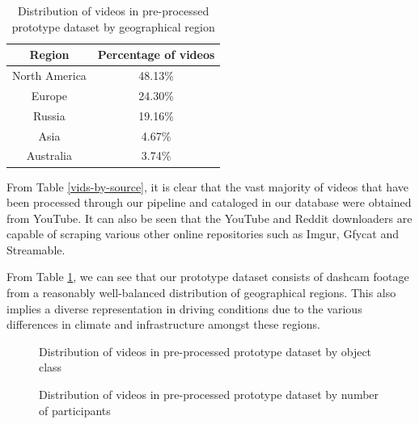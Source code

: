 \documentclass[letterpaper, 10 pt, conference]{ieeeconf}
\begin{document}
\begin{table}[!h]
	\caption{Distribution of videos in pre-processed prototype dataset by geographical region}
	\label{vids-by-region}
	\begin{center}
		\begin{tabular}{|c|c|}
			\hline
			Region & Percentage of videos \\
			\hline
			North America & 48.13\% \\
			\hline
			Europe & 24.30\% \\
			\hline
			Russia & 19.16\% \\
			\hline
			Asia & 4.67\% \\
			\hline
			Australia & 3.74\% \\
			\hline
		\end{tabular}
	\end{center}
\end{table}

From Table \ref{vids-by-source}, it is clear that the vast majority of videos that have been processed through our pipeline and cataloged in our database were obtained from YouTube. It can also be seen that the YouTube and Reddit downloaders are capable of scraping various other online repositories such as Imgur, Gfycat and Streamable. 

From Table \ref{vids-by-region}, we can see that our prototype dataset consists of dashcam footage from a reasonably well-balanced distribution of geographical regions. This also implies a diverse representation in driving conditions due to the various differences in climate and infrastructure amongst these regions.

\begin{figure}[!h]
	\centering
	\caption{Distribution of videos in pre-processed prototype dataset by object class}
	\label{fig:obj-by-class}
\end{figure}

\begin{figure}[!h]
	\centering
	\caption{Distribution of videos in pre-processed prototype dataset by number of participants}
	\label{fig:vids-by-participant}
\end{figure}
\end{document}

